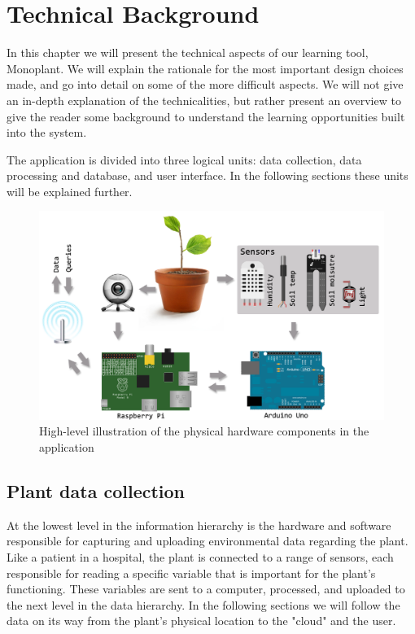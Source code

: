 \chapter{Technical Background}
In this chapter we will present the technical aspects of our learning tool, Monoplant. We will explain the rationale for the most important design choices made, and go into detail on some of the more difficult aspects. We will not give an in-depth explanation of the technicalities, but rather present an overview to give the reader some background to understand the learning opportunities built into the system. 

The application is divided into three logical units: data collection, data processing and database, and user interface. In the following sections these units will be explained further. 



\begin{figure}
\centering
\includegraphics[width=1\textwidth]{img/hardware/application.png}
\caption{High-level illustration of the physical hardware components in the application}
\label{fig:application}
\end{figure}

\section{Plant data collection}
At the lowest level in the information hierarchy is the hardware and software responsible for capturing and uploading environmental data regarding the plant. Like a patient in a hospital, the plant is connected to a range of sensors, each responsible for reading a specific variable that is important for the plant's functioning. These variables are sent to a computer, processed, and uploaded to the next level in the data hierarchy. In the following sections we will follow the data on its way from the plant's physical location to the "cloud" and the user.

